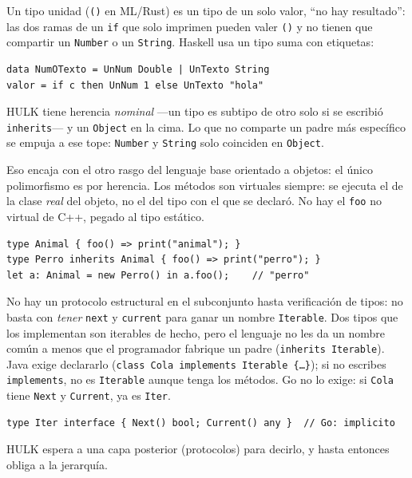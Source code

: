 \documentclass[11pt,a4paper]{article}
\begin{document}
Un tipo unidad (\texttt{()} en ML/Rust) es un tipo de un solo valor, ``no hay resultado'': las dos ramas de un \texttt{if} que solo imprimen pueden valer \texttt{()} y no tienen que compartir un \texttt{Number} o un \texttt{String}. Haskell usa un tipo suma con etiquetas:

\begin{lstlisting}[language={},numbers=none]
data NumOTexto = UnNum Double | UnTexto String
valor = if c then UnNum 1 else UnTexto "hola"
\end{lstlisting}

HULK tiene herencia \emph{nominal} ---un tipo es subtipo de otro solo si se escribió \texttt{inherits}--- y un \texttt{Object} en la cima. Lo que no comparte un padre más específico se empuja a ese tope: \texttt{Number} y \texttt{String} solo coinciden en \texttt{Object}.

Eso encaja con el otro rasgo del lenguaje base orientado a objetos: el único polimorfismo es por herencia. Los métodos son virtuales siempre: se ejecuta el de la clase \emph{real} del objeto, no el del tipo con el que se declaró. No hay el \texttt{foo} no virtual de C++, pegado al tipo estático.

\begin{lstlisting}[language={},numbers=none]
type Animal { foo() => print("animal"); }
type Perro inherits Animal { foo() => print("perro"); }
let a: Animal = new Perro() in a.foo();    // "perro"
\end{lstlisting}

No hay un protocolo estructural en el subconjunto hasta verificación de tipos: no basta con \emph{tener} \texttt{next} y \texttt{current} para ganar un nombre \texttt{Iterable}. Dos tipos que los implementan son iterables de hecho, pero el lenguaje no les da un nombre común a menos que el programador fabrique un padre (\texttt{inherits Iterable}). Java exige declararlo (\texttt{class Cola implements Iterable \{\ldots\}}); si no escribes \texttt{implements}, no es \texttt{Iterable} aunque tenga los métodos. Go no lo exige: si \texttt{Cola} tiene \texttt{Next} y \texttt{Current}, ya es \texttt{Iter}.

\begin{lstlisting}[language={},numbers=none]
type Iter interface { Next() bool; Current() any }  // Go: implicito
\end{lstlisting}

HULK espera a una capa posterior (protocolos) para decirlo, y hasta entonces obliga a la jerarquía.
\end{document}
